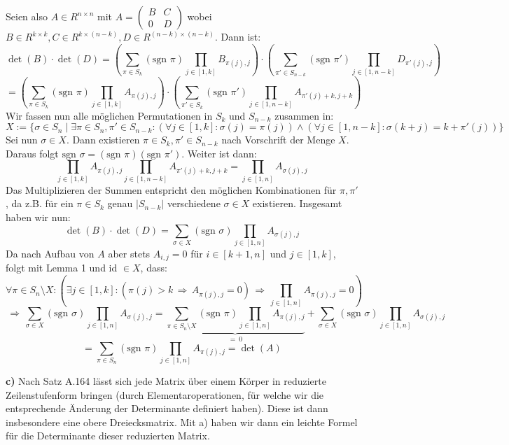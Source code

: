 \documentclass[a4paper,graphics,11pt]{article}
\newcommand{\sgn}{\text{sgn }}
\begin{document}
Seien also $A \in R^{n\times n}$ mit $A = \begin{pmatrix}B & C \\ 0 & D\end{pmatrix}$
wobei $B \in R^{k\times k}, C \in R^{k \times (n-k)}, D \in R^{(n-k)\times(n-k)}$.
Dann ist:
$$
    \det(B)\cdot \det(D)
    = \left(\sum_{\pi \in S_k}(\sgn \pi) \prod_{j \in [1,k]} B_{\pi(j),j}\right)
        \cdot \left(\sum_{\pi' \in S_{n-k}}(\sgn \pi') \prod_{j \in [1,n-k]} D_{\pi'(j),j}\right)
$$$$
    = \left(\sum_{\pi \in S_k}(\sgn \pi) \prod_{j \in [1,k]} A_{\pi(j),j}\right)
        \cdot \left(\sum_{\pi' \in S_k}(\sgn \pi') \prod_{j \in [1,n-k]} A_{\pi'(j)+k,j+k}\right)
$$
Wir fassen nun alle möglichen Permutationen in $S_k$ und $S_{n-k}$ zusammen in:
$$
    X := \{\sigma \in S_n \mid \exists \pi \in S_n, \pi' \in S_{n-k} :
        (\forall j \in [1,k] : \sigma(j) = \pi(j))
        \land
        (\forall j \in [1,n-k] : \sigma(k+j) = k+\pi'(j))
        \}
$$
Sei nun $\sigma \in X$. Dann existieren $\pi \in S_k, \pi' \in S_{n-k}$ nach
Vorschrift der Menge $X$.\\
Daraus folgt $\sgn \sigma = (\sgn \pi)(\sgn \pi')$. Weiter ist dann:
$$
    \prod_{j \in [1,k]} A_{\pi(j),j} \prod_{j \in [1,n-k]} A_{\pi'(j)+k, j+k}
    = \prod_{j \in [1,n]} A_{\sigma(j), j}
$$
Das Multiplizieren der Summen entspricht den möglichen Kombinationen für
$\pi, \pi'$, da z.B. für ein $\pi \in S_k$ genau $|S_{n-k}|$ verschiedene $\sigma \in X$ existieren. Insgesamt haben wir nun:
$$
    \det(B) \cdot \det(D)
    = \sum_{\sigma \in X} (\sgn \sigma) \prod_{j \in [1,n]} A_{\sigma(j), j}
$$
Da nach Aufbau von $A$ aber stets $A_{i,j} = 0$ für $i \in [k+1,n]$ und $j \in [1,k]$,
folgt mit Lemma 1 und id $\in X$, dass:
$$
    \forall \pi \in S_n \setminus X : (\exists j \in [1,k] : (\pi(j) > k \,\Longrightarrow\, A_{\pi(j),j} = 0) \,\Longrightarrow\, \prod_{j \in [1,n]} A_{\pi(j),j} = 0)
$$$$
    \,\Longrightarrow\, \sum_{\sigma \in X}(\sgn \sigma) \prod_{j \in [1,n]} A_{\sigma(j), j}
    = \underbrace{\sum_{\pi \in S_n \setminus X} (\sgn \pi) \prod_{j \in [1,n]} A_{\pi(j),j}}_{=\ 0}
    + \sum_{\sigma \in X} (\sgn \sigma) \prod_{j \in [1,n]} A_{\sigma(j),j}
$$$$
    = \sum_{\pi \in S_n}(\sgn \pi)\prod_{j \in [1,n]} A_{\pi(j),j} = \det(A)
$$

\textbf{c)}
Nach Satz A.164 lässt sich jede Matrix über einem Körper in reduzierte Zeilenstufenform
bringen (durch Elementaroperationen, für welche wir die entsprechende Änderung der
Determinante definiert haben). Diese ist dann insbesondere eine obere Dreiecksmatrix.
Mit a) haben wir dann ein leichte Formel für die Determinante dieser reduzierten Matrix.
\end{document}
